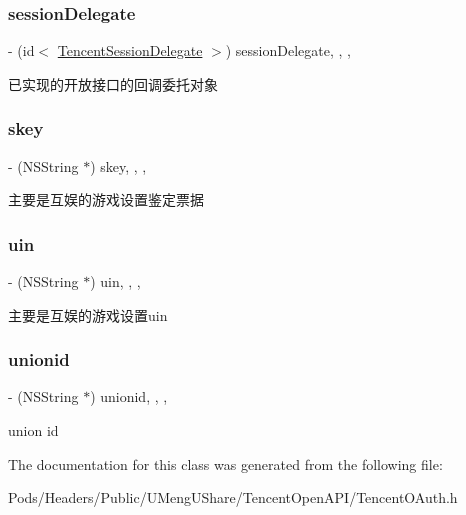 \subsubsection{\texorpdfstring{session\+Delegate}{sessionDelegate}}
{\footnotesize\ttfamily -\/ (id$<$ \mbox{\hyperlink{protocol_tencent_session_delegate-p}{Tencent\+Session\+Delegate}} $>$) session\+Delegate\hspace{0.3cm}{\ttfamily [read]}, {\ttfamily [write]}, {\ttfamily [nonatomic]}, {\ttfamily [assign]}}

已实现的开放接口的回调委托对象 \mbox{\label{interface_tencent_o_auth_a9227041b4b5f5e738a9bfae5362703b2}} 
\subsubsection{\texorpdfstring{skey}{skey}}
{\footnotesize\ttfamily -\/ (N\+S\+String $\ast$) skey\hspace{0.3cm}{\ttfamily [read]}, {\ttfamily [write]}, {\ttfamily [nonatomic]}, {\ttfamily [retain]}}

主要是互娱的游戏设置鉴定票据 \mbox{\label{interface_tencent_o_auth_a458a807948a610662b8dac4a7964b3cf}} 
\subsubsection{\texorpdfstring{uin}{uin}}
{\footnotesize\ttfamily -\/ (N\+S\+String $\ast$) uin\hspace{0.3cm}{\ttfamily [read]}, {\ttfamily [write]}, {\ttfamily [nonatomic]}, {\ttfamily [retain]}}

主要是互娱的游戏设置uin \mbox{\label{interface_tencent_o_auth_a6641fb65b368515918f81edceba6e06e}} 
\subsubsection{\texorpdfstring{unionid}{unionid}}
{\footnotesize\ttfamily -\/ (N\+S\+String $\ast$) unionid\hspace{0.3cm}{\ttfamily [read]}, {\ttfamily [write]}, {\ttfamily [nonatomic]}, {\ttfamily [retain]}}

union id 

The documentation for this class was generated from the following file\+:\begin{DoxyCompactItemize}
\item 
Pods/\+Headers/\+Public/\+U\+Meng\+U\+Share/\+Tencent\+Open\+A\+P\+I/Tencent\+O\+Auth.\+h\end{DoxyCompactItemize}
